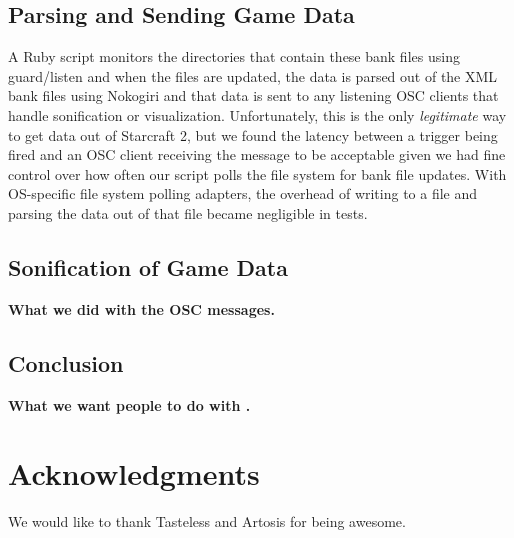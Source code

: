 \documentclass{nime-document-class}
\begin{document}
\subsection{Parsing and Sending Game Data}
A Ruby script monitors the directories that contain these bank files using guard/listen and when the files are updated, the data is parsed out of the XML bank files using Nokogiri and that data is sent to any listening OSC clients that handle sonification or visualization.
Unfortunately, this is the only {\em legitimate} way to get data out of Starcraft 2, but we found the latency between a trigger being fired and an OSC client receiving the message to be acceptable given we had fine control over how often our script polls the file system for bank file updates.
With OS-specific file system polling adapters, the overhead of writing to a file and parsing the data out of that file became negligible in tests.

\subsection{Sonification of Game Data}
{\bf What we did with the OSC messages.}

\subsection{Conclusion}
{\bf What we want people to do with \projectName{}.}

\section{Acknowledgments}
We would like to thank Tasteless and Artosis for being awesome.

{}


\end{document}
